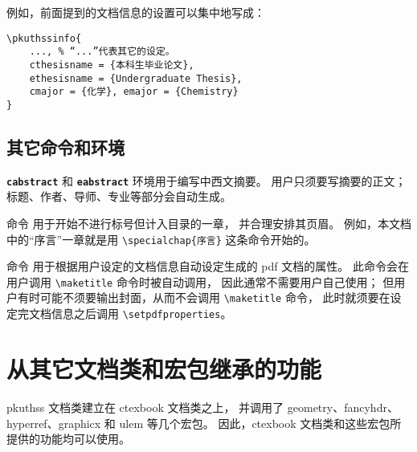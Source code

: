 例如，前面提到的文档信息的设置可以集中地写成：
\begin{Verbatim}
\pkuthssinfo{
	..., % “...”代表其它的设定。
	cthesisname = {本科生毕业论文},
	ethesisname = {Undergraduate Thesis},
	cmajor = {化学}, emajor = {Chemistry}
}
\end{Verbatim}

\subsection{其它命令和环境}\label{ssec:misc}

\texttt{\bfseries cabstract} 和 \texttt{\bfseries eabstract}
环境用于编写中西文摘要。
用户只须要写摘要的正文；标题、作者、导师、专业等部分会自动生成。

\texttt{\bfseries\string\specialchap} 命令
用于开始不进行标号但计入目录的一章，
并合理安排其页眉。%
例如，本文档中的“序言”一章就是用 \verb|\specialchap{序言}|
这条命令开始的。%

\texttt{\bfseries\string\setpdfproperties} 命令
用于根据用户设定的文档信息自动设定生成的 pdf 文档的属性。
此命令会在用户调用 \verb|\maketitle| 命令时被自动调用，
因此通常不需要用户自己使用；
但用户有时可能不须要输出封面，从而不会调用 \verb|\maketitle| 命令，
此时就须要在设定完文档信息之后调用 \verb|\setpdfproperties|。%

\section{从其它文档类和宏包继承的功能}\label{sec:thirdparty}

pkuthss 文档类建立在 ctexbook 文档类之上，
并调用了 geometry、fancyhdr、%
hyperref、graphicx
和 ulem 等几个宏包。
因此，ctexbook 文档类和这些宏包所提供的功能均可以使用。

